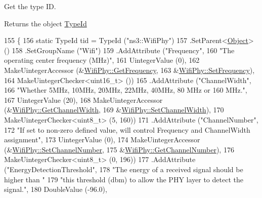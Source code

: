 Get the type ID. 

\begin{DoxyReturn}{Returns}
the object \hyperlink{classns3_1_1TypeId}{Type\+Id} 
\end{DoxyReturn}

\begin{DoxyCode}
155 \{
156   \textcolor{keyword}{static} TypeId tid = TypeId (\textcolor{stringliteral}{"ns3::WifiPhy"})
157     .SetParent<\hyperlink{classns3_1_1Object_a40860402e64d8008fb42329df7097cdb}{Object}> ()
158     .SetGroupName (\textcolor{stringliteral}{"Wifi"})
159     .AddAttribute (\textcolor{stringliteral}{"Frequency"},
160                    \textcolor{stringliteral}{"The operating center frequency (MHz)"},
161                    UintegerValue (0),
162                    MakeUintegerAccessor (&\hyperlink{classns3_1_1WifiPhy_ad2508d94faf22d690d6b8b4367934fd1}{WifiPhy::GetFrequency},
163                                          &\hyperlink{classns3_1_1WifiPhy_afecd69b20631e112aa863dbed4c4bd22}{WifiPhy::SetFrequency}),
164                    MakeUintegerChecker<uint16\_t> ())
165     .AddAttribute (\textcolor{stringliteral}{"ChannelWidth"},
166                    \textcolor{stringliteral}{"Whether 5MHz, 10MHz, 20MHz, 22MHz, 40MHz, 80 MHz or 160 MHz."},
167                    UintegerValue (20),
168                    MakeUintegerAccessor (&\hyperlink{classns3_1_1WifiPhy_a4a5d5009b3b3308f2baeed42a2007189}{WifiPhy::GetChannelWidth},
169                                          &\hyperlink{classns3_1_1WifiPhy_ad4be164ac9858e525cf6c6194c39e015}{WifiPhy::SetChannelWidth}),
170                    MakeUintegerChecker<uint8\_t> (5, 160))
171     .AddAttribute (\textcolor{stringliteral}{"ChannelNumber"},
172                    \textcolor{stringliteral}{"If set to non-zero defined value, will control Frequency and ChannelWidth assignment"},
173                    UintegerValue (0),
174                    MakeUintegerAccessor (&\hyperlink{classns3_1_1WifiPhy_a2d13cf6ae4c185cae8516516afe4a32a}{WifiPhy::SetChannelNumber},
175                                          &\hyperlink{classns3_1_1WifiPhy_a5cf0ccf06109ace61db51c83e91b7e8d}{WifiPhy::GetChannelNumber}),
176                    MakeUintegerChecker<uint8\_t> (0, 196))
177     .AddAttribute (\textcolor{stringliteral}{"EnergyDetectionThreshold"},
178                    \textcolor{stringliteral}{"The energy of a received signal should be higher than "}
179                    \textcolor{stringliteral}{"this threshold (dbm) to allow the PHY layer to detect the signal."},
180                    DoubleValue (-96.0),

\end{DoxyCode}
